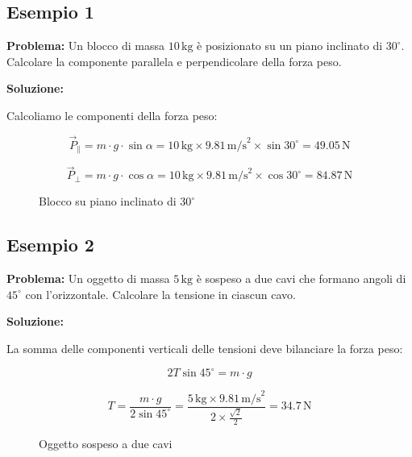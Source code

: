 \documentclass[a4paper,12pt]{article}
\begin{document}
\subsection*{Esempio 1}

\textbf{Problema:} Un blocco di massa $10\,\text{kg}$ è posizionato su un piano inclinato di $30^\circ$. Calcolare la componente parallela e perpendicolare della forza peso.

\textbf{Soluzione:}

Calcoliamo le componenti della forza peso:

\[
\vec{P}_\parallel = m \cdot g \cdot \sin{\alpha} = 10\,\text{kg} \times 9.81\,\text{m/s}^2 \times \sin{30^\circ} = 49.05\,\text{N}
\]

\[
\vec{P}_\perp = m \cdot g \cdot \cos{\alpha} = 10\,\text{kg} \times 9.81\,\text{m/s}^2 \times \cos{30^\circ} = 84.87\,\text{N}
\]

\begin{figure}[h]
    \centering
    \caption{Blocco su piano inclinato di $30^\circ$}
\end{figure}

\subsection*{Esempio 2}

\textbf{Problema:} Un oggetto di massa $5\,\text{kg}$ è sospeso a due cavi che formano angoli di $45^\circ$ con l'orizzontale. Calcolare la tensione in ciascun cavo.

\textbf{Soluzione:}

La somma delle componenti verticali delle tensioni deve bilanciare la forza peso:

\[
2 T \sin{45^\circ} = m \cdot g
\]

\[
T = \frac{m \cdot g}{2 \sin{45^\circ}} = \frac{5\,\text{kg} \times 9.81\,\text{m/s}^2}{2 \times \frac{\sqrt{2}}{2}} = 34.7\,\text{N}
\]

\begin{figure}[h]
    \centering
    \caption{Oggetto sospeso a due cavi}
\end{figure}
\end{document}
